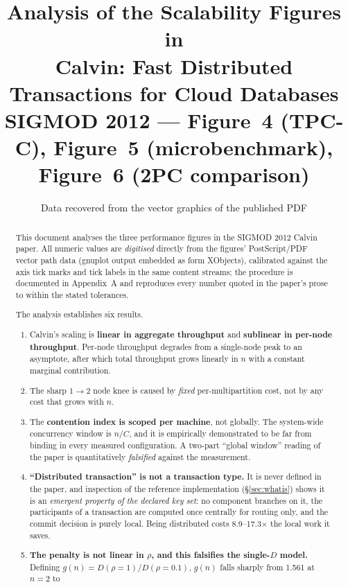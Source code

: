 \documentclass[11pt,a4paper]{article}
\title{\vspace{-1.2cm}\textbf{Analysis of the Scalability Figures in}\\[2pt]
       {\large Calvin: Fast Distributed Transactions for Cloud Databases}\\[6pt]
       \large SIGMOD 2012 \textnormal{---} \small Figure~4 (TPC-C), Figure~5 (microbenchmark), Figure~6 (2PC comparison)}
\author{Data recovered from the vector graphics of the published PDF}
\date{}
\newcommand{\gRatio}{g(n)}
\begin{document}
\maketitle
\vspace{-0.6cm}

\begin{abstract}
\noindent
This document analyses the three performance figures in the SIGMOD 2012 Calvin
paper. All numeric values are \emph{digitised} directly from the figures'
PostScript/PDF vector path data (gnuplot output embedded as form XObjects),
calibrated against the axis tick marks and tick labels in the same content
streams; the procedure is documented in Appendix~A and reproduces every
number quoted in the paper's prose to within the stated tolerances.

The analysis establishes six results.
\begin{enumerate}[leftmargin=1.4em,itemsep=2pt]
\item Calvin's scaling is \textbf{linear in aggregate throughput} and
      \textbf{sublinear in per-node throughput}. Per-node throughput
      degrades from a single-node peak to an asymptote, after which total
      throughput grows linearly in $n$ with a constant marginal contribution.
\item The sharp $1\to2$ node knee is caused by \emph{fixed} per-multipartition
      cost, not by any cost that grows with $n$.
\item The \textbf{contention index is scoped per machine}, not globally. The
      system-wide concurrency window is $n/C$, and it is empirically
      demonstrated to be far from binding in every measured configuration.
      A two-part ``global window'' reading of the paper is quantitatively
      \emph{falsified} against the measurement.
\item \textbf{``Distributed transaction'' is not a transaction type.} It is
      never defined in the paper, and inspection of the reference
      implementation (\S\ref{sec:whatis}) shows it is an \emph{emergent
      property of the declared key set}: no component branches on it, the
      participants of a transaction are computed once centrally for routing
      only, and the commit decision is purely local. Being distributed costs
      \num{8.9}--\num{17.3}$\times$ the local work it saves.
\item \textbf{The penalty is not linear in $\rho$, and this falsifies the
      single-$D$ model.} Defining $\gRatio = D(\rho{=}1)/D(\rho{=}0.1)$,
      $\gRatio$ falls sharply from \num{1.561} at $n{=}2$ to

\end{enumerate}
\end{abstract}
\end{document}
